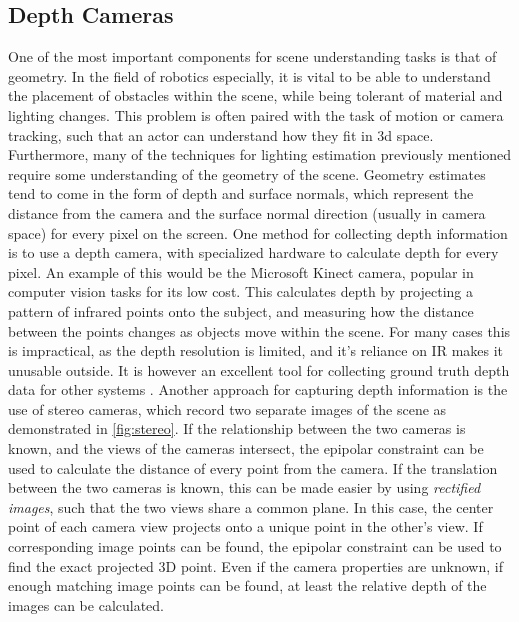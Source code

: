 \documentclass[ %
                    author={Gavin Parker},
                supervisor={Dr. Neill Campbell},
                    degree={MEng},
                     title={Deep Learning for Illumination Estimation from Stereo Images},
                  subtitle={},
                      type={Research},
                      year={2018} ]{dissertation}
\begin{document}
\subsection{Depth Cameras}
One of the most important components for scene understanding tasks is that of geometry. In the field of robotics especially, it is vital to be able to understand the placement of obstacles within the scene, while being tolerant of material and lighting changes. This problem is often paired with the task of motion or camera tracking, such that an actor can understand how they fit in 3d space. Furthermore, many of the techniques for lighting estimation previously mentioned require some understanding of the geometry of the scene. Geometry estimates tend to come in the form of depth and surface normals, which represent the distance from the camera and the surface normal direction (usually in camera space) for every pixel on the screen.
\newline
One method for collecting depth information is to use a depth camera, with specialized hardware to calculate depth for every pixel. An example of this would be the Microsoft Kinect camera, popular in computer vision tasks for its low cost. This calculates depth by projecting a pattern of infrared points onto the subject, and measuring how the distance between the points changes as objects move within the scene. For many cases this is impractical, as the depth resolution is limited, and it's reliance on IR makes it unusable outside. It is however an excellent tool for collecting ground truth depth data for other systems \cite{Khoshelham_accuracyand}.
\newline
Another approach for capturing depth information is the use of stereo cameras, which record two separate images of the scene as demonstrated in \ref{fig:stereo}. If the relationship between the two cameras is known, and the views of the cameras intersect, the epipolar constraint can be used to calculate the distance of every point from the camera. If the translation between the two cameras is known, this can be made easier by using \textit{rectified images}, such that the two views share a common plane. In this case, the center point of each camera view projects onto a unique point in the other's view. If corresponding image points can be found, the epipolar constraint can be used to find the exact projected 3D point. Even if the camera properties are unknown, if enough matching image points can be found, at least the relative depth of the images can be calculated.
\end{document}
